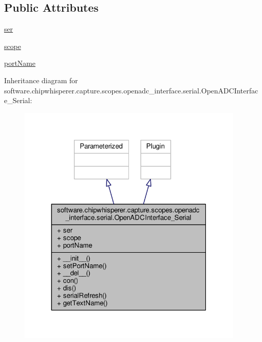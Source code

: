 \subsection*{Public Attributes}
\begin{DoxyCompactItemize}
\item 
\hyperlink{classsoftware_1_1chipwhisperer_1_1capture_1_1scopes_1_1openadc__interface_1_1serial_1_1OpenADCInterface__Serial_a2929eb39f0b9bd82649ba87de5c3551d}{ser}
\item 
\hyperlink{classsoftware_1_1chipwhisperer_1_1capture_1_1scopes_1_1openadc__interface_1_1serial_1_1OpenADCInterface__Serial_aa5eed3d2850db93835fc543b227f7901}{scope}
\item 
\hyperlink{classsoftware_1_1chipwhisperer_1_1capture_1_1scopes_1_1openadc__interface_1_1serial_1_1OpenADCInterface__Serial_a6c3a93b4197878edb2c6ab313fcead73}{port\+Name}
\end{DoxyCompactItemize}


Inheritance diagram for software.\+chipwhisperer.\+capture.\+scopes.\+openadc\+\_\+interface.\+serial.\+Open\+A\+D\+C\+Interface\+\_\+\+Serial\+:\nopagebreak
\begin{figure}[H]
\begin{center}
\leavevmode
\includegraphics[width=307pt]{d3/dd1/classsoftware_1_1chipwhisperer_1_1capture_1_1scopes_1_1openadc__interface_1_1serial_1_1OpenADCInterface__Serial__inherit__graph}
\end{center}
\end{figure}



